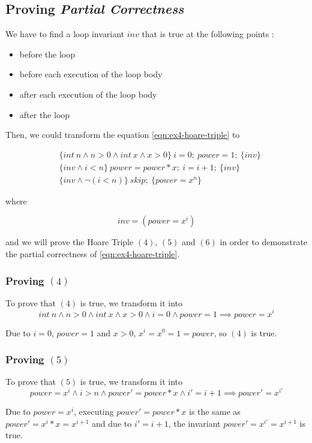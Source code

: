\documentclass[a4paper,11pt]{report}
\begin{document}
\subsection*{Proving \textit{Partial Correctness}}

We have to find a loop invariant $inv$ that is true at the following points :
\begin{itemize}
\item before the loop
\item before each execution of the loop body
\item after each execution of the loop body
\item after the loop
\end{itemize}

Then, we could transform the equation \ref{eqn:ex4-hoare-triple} to

\begin{align}
  & \{int\ n \wedge n > 0 \wedge int\ x \wedge x > 0\}\ i=0;\ power=1;\ \{inv\} \\
  & \{inv \wedge i < n \}\ power = power * x;\ i = i + 1;\ \{inv\} \\
  & \{inv \wedge \neg(i < n)\}\ skip;\ \{power = x^n\}
\end{align}  

where

$$
inv = (power = x^i)
$$

and we will prove the Hoare Triple $(4)$, $(5)$ and $(6)$ in order to
demonstrate the partial correctness of \ref{eqn:ex4-hoare-triple}.

\subsubsection*{Proving $(4)$}

To prove that $(4)$ is true, we transform it into
$$
int\ n \wedge n > 0 \wedge int\ x \wedge x > 0 \wedge i = 0 \wedge power = 1
\implies power = x^i
$$

Due to $i=0$, $power = 1$ and $x > 0$, $x^i = x^0 = 1 = power$, so $(4)$ is true.

\subsubsection*{Proving $(5)$}

To prove that $(5)$ is true, we transform it into
\[
  power = x^i \wedge i > n \wedge power' = power * x \wedge i' = i + 1 \implies
  power' = x^{i'}
\]

Due to $power = x^i$, executing $power' = power * x$ is the same as $power' =
x^i * x = x^{i+1}$ and due to $i' = i + 1$, the invariant $power' = x^{i'} =
x^{i + 1}$ is true.
\end{document}
